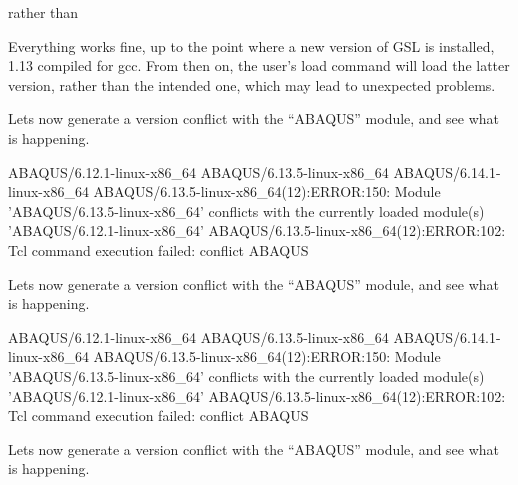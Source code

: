 \begin{prompt}
\end{prompt}

rather than

\begin{prompt}
\end{prompt}

Everything works fine, up to the point where a new version of GSL is installed,
1.13 compiled for gcc. From then on, the user's load command will load the
latter version, rather than the intended one, which may lead to unexpected
problems.

\ifantwerpen
Lets now generate a version conflict with the ``ABAQUS'' module, and see what
is happening.

\begin{prompt}
ABAQUS/6.12.1-linux-x86_64
ABAQUS/6.13.5-linux-x86_64
ABAQUS/6.14.1-linux-x86_64
ABAQUS/6.13.5-linux-x86_64(12):ERROR:150: Module 'ABAQUS/6.13.5-linux-x86_64' conflicts with the currently loaded module(s) 'ABAQUS/6.12.1-linux-x86_64'
ABAQUS/6.13.5-linux-x86_64(12):ERROR:102: Tcl command execution failed: conflict ABAQUS
\end{prompt}
\fi
\ifgent
Lets now generate a version conflict with the ``ABAQUS'' module, and see what
is happening.

\begin{prompt}
ABAQUS/6.12.1-linux-x86_64
ABAQUS/6.13.5-linux-x86_64
ABAQUS/6.14.1-linux-x86_64
ABAQUS/6.13.5-linux-x86_64(12):ERROR:150: Module 'ABAQUS/6.13.5-linux-x86_64' conflicts with the currently loaded module(s) 'ABAQUS/6.12.1-linux-x86_64'
ABAQUS/6.13.5-linux-x86_64(12):ERROR:102: Tcl command execution failed: conflict ABAQUS
\end{prompt}
\fi
\ifbrussel
Lets now generate a version conflict with the ``ABAQUS'' module, and see what
is happening.

